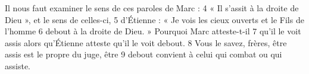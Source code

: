 Il nous faut examiner le sens de ces paroles de Marc :	 
4	 	« Il s'assit à la droite de Dieu », et le sens de celles-ci,	 
5	 	d'Étienne : « Je vois les cieux ouverts et le Fils de l'homme	 
6	 	debout à la droite de Dieu. » Pourquoi Marc atteste-t-il	 
7	 	qu'il le voit assis alors qu'Étienne atteste qu'il le voit debout.	 
8	 	Vous le savez, frères, être assis est le propre du juge, être	 
9	 	debout convient à celui qui combat ou qui assiste.
